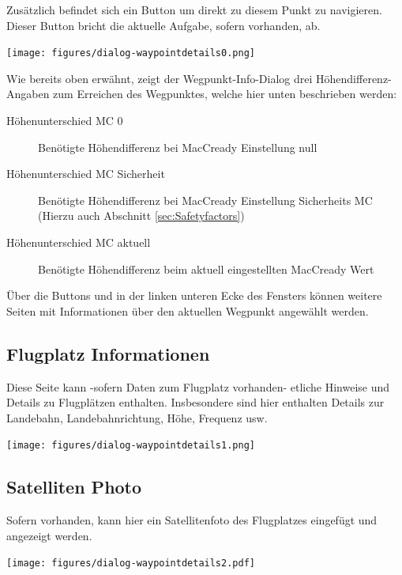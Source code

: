 Zusätzlich befindet sich ein Button  um direkt zu diesem Punkt zu navigieren.  Dieser Button bricht die aktuelle Aufgabe, sofern vorhanden, ab.
\begin{center}
\texttt{[image: figures/dialog-waypointdetails0.png]}
\end{center}

Wie bereits oben erwähnt, zeigt der Wegpunkt-Info-Dialog drei Höhendifferenz-Angaben zum Erreichen des Wegpunktes, welche hier unten beschrieben werden:

\begin{description}
\item[Höhenunterschied MC 0] Benötigte Höhendifferenz bei MacCready Einstellung null
\item[Höhenunterschied MC Sicherheit] Benötigte Höhendifferenz bei MacCready Einstellung Sicherheits MC (Hierzu auch Abschnitt \ref{sec:Safetyfactors})
\item[Höhenunterschied MC aktuell] Benötigte Höhendifferenz beim  aktuell eingestellten MacCready Wert
\end{description}

Über die Buttons \button{$<$} und \button{$>$} in der linken unteren Ecke des Fensters können weitere Seiten mit Informationen über den aktuellen Wegpunkt angewählt werden.


\subsection*{Flugplatz Informationen}
Diese Seite kann -sofern Daten zum Flugplatz vorhanden- etliche Hinweise und Details zu Flugplätzen enthalten. Insbesondere sind hier enthalten Details zur Landebahn, Landebahnrichtung, Höhe, Frequenz usw.

\begin{center}
\texttt{[image: figures/dialog-waypointdetails1.png]}
\end{center}

\subsection*{Satelliten Photo}
\halt Sofern vorhanden, kann hier ein Satellitenfoto des Flugplatzes eingefügt und angezeigt werden.

\begin{center}
\texttt{[image: figures/dialog-waypointdetails2.pdf]}
\end{center}


